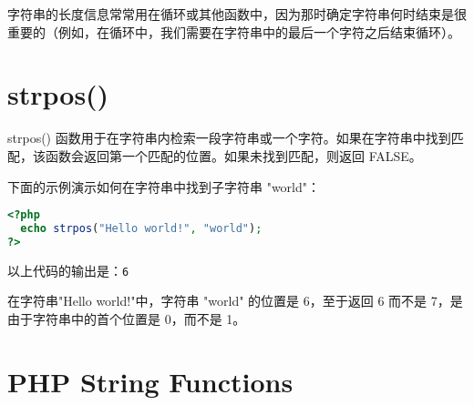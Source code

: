 字符串的长度信息常常用在循环或其他函数中，因为那时确定字符串何时结束是很重要的（例如，在循环中，我们需要在字符串中的最后一个字符之后结束循环）。

\section{strpos()}

strpos() 函数用于在字符串内检索一段字符串或一个字符。如果在字符串中找到匹配，该函数会返回第一个匹配的位置。如果未找到匹配，则返回 FALSE。

下面的示例演示如何在字符串中找到子字符串 "world"：



\begin{lstlisting}[language=PHP]
<?php
  echo strpos("Hello world!", "world");
?>
\end{lstlisting}

以上代码的输出是：\verb|6|

在字符串"Hello world!"中，字符串 "world" 的位置是 6，至于返回 6 而不是 7，是由于字符串中的首个位置是 0，而不是 1。


\section{PHP String Functions}



